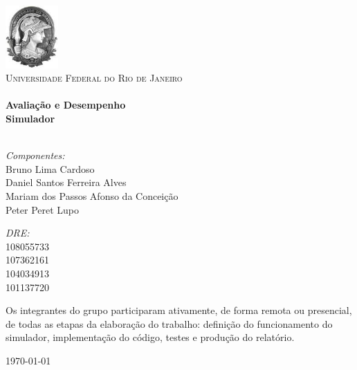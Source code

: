 \begin{titlepage}

\begin{center}

\includegraphics[width=0.15\textwidth]{./logo.jpeg}\\[1cm]

\textsc{\LARGE Universidade Federal do Rio de Janeiro}\\[1.5cm]


\HRule \\[0.4cm]
{ \huge \bfseries Avaliação e Desempenho }\\[0.4cm]
{ \huge \bfseries Simulador} \\[0.4cm]
\HRule \\[1.5cm]


\begin{minipage}{0.6\textwidth}
  \begin{flushleft} 
  \emph{Componentes:}\\
  Bruno Lima Cardoso \\
  Daniel Santos Ferreira Alves \\
  Mariam dos Passos Afonso da Conceição \\
  Peter Peret Lupo
  \end{flushleft}
\end{minipage}
\begin{minipage}{0.3\textwidth}
  \begin{flushright}
  \emph{DRE:} \\
  108055733 \\
  107362161 \\
  104034913 \\
  101137720
  \end{flushright}
\end{minipage}

\vfill

\begin{minipage}{0.8\textwidth}
  Os integrantes do grupo participaram ativamente, de forma remota ou presencial, de todas as etapas da elaboração do trabalho: definição do funcionamento do simulador, implementação do código, testes e produção do relatório.
\end{minipage}

\vfill


{\large \today}

\end{center}

\end{titlepage}